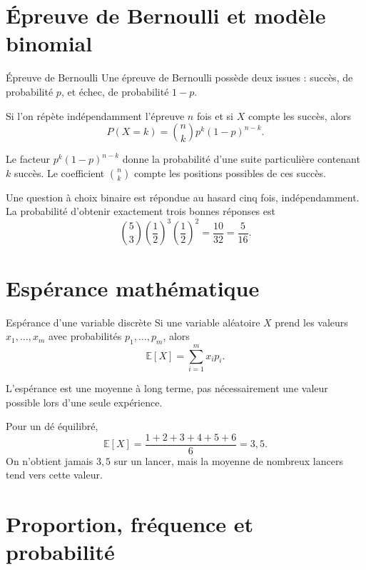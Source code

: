 \documentclass[12pt,a4paper,openany]{book}
\begin{document}
\section{Épreuve de Bernoulli et modèle binomial}

\begin{definition}{Épreuve de Bernoulli}{}
Une épreuve de Bernoulli possède deux issues : succès, de probabilité $p$, et échec, de probabilité $1-p$.
\end{definition}

Si l'on répète indépendamment l'épreuve $n$ fois et si $X$ compte les succès, alors
\[
P(X=k)=\binom nk p^k(1-p)^{n-k}.
\]

\begin{intuitionbox}
Le facteur $p^k(1-p)^{n-k}$ donne la probabilité d'une suite particulière contenant $k$ succès. Le coefficient $\binom nk$ compte les positions possibles de ces succès.
\end{intuitionbox}

\begin{examplebox}
Une question à choix binaire est répondue au hasard cinq fois, indépendamment. La probabilité d'obtenir exactement trois bonnes réponses est
\[
\binom53\left(\frac12\right)^3\left(\frac12\right)^2
=\frac{10}{32}=\frac5{16}.
\]
\end{examplebox}

\section{Espérance mathématique}

\begin{definition}{Espérance d'une variable discrète}{}
Si une variable aléatoire $X$ prend les valeurs $x_1,\ldots,x_m$ avec probabilités $p_1,\ldots,p_m$, alors
\[
\mathbb E[X]=\sum_{i=1}^m x_i p_i.
\]
\end{definition}

L'espérance est une moyenne à long terme, pas nécessairement une valeur possible lors d'une seule expérience.

\begin{examplebox}
Pour un dé équilibré,
\[
\mathbb E[X]=\frac{1+2+3+4+5+6}{6}=3{,}5.
\]
On n'obtient jamais $3{,}5$ sur un lancer, mais la moyenne de nombreux lancers tend vers cette valeur.
\end{examplebox}


\section{Proportion, fréquence et probabilité}
\end{document}
